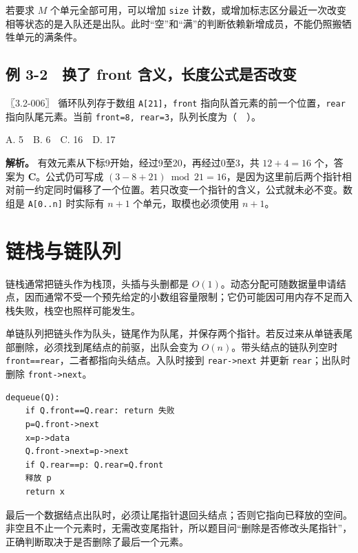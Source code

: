 若要求 \(M\) 个单元全部可用，可以增加 \texttt{size} 计数，或增加标志区分最近一次改变相等状态的是入队还是出队。此时``空''和``满''的判断依赖新增成员，不能仍照搬牺牲单元的满条件。

\subsection{例 3-2　换了 front 含义，长度公式是否改变}\label{ds-ex3-2}

\noindent{}〖3.2-006〗 循环队列存于数组 \texttt{A{[}21{]}}，\texttt{front} 指向队首元素的前一个位置，\texttt{rear} 指向队尾元素。当前 \texttt{front=8,}\allowbreak{}\texttt{\ rear=3}，队列长度为（　）。

A. 5　B. 6　C. 16　D. 17


\textbf{解析。} 有效元素从下标9开始，经过9至20，再经过0至3，共 \(12+4=16\) 个，答案为 \textbf{C}。公式仍可写成 \((3-8+21)\bmod21=16\)，是因为这里前后两个指针相对前一约定同时偏移了一个位置。若只改变一个指针的含义，公式就未必不变。数组是 \texttt{A{[}0..n{]}} 时实际有 \(n+1\) 个单元，取模也必须使用 \(n+1\)。

\section{链栈与链队列}\label{ds-03-04}

链栈通常把链头作为栈顶，头插与头删都是 \(O(1)\)。动态分配可随数据量申请结点，因而通常不受一个预先给定的小数组容量限制；它仍可能因可用内存不足而入栈失败，栈空也照样可能发生。

单链队列把链头作为队头，链尾作为队尾，并保存两个指针。若反过来从单链表尾部删除，必须找到尾结点的前驱，出队会变为 \(O(n)\)。带头结点的链队列空时 \texttt{front==rear}，二者都指向头结点。入队时接到 \texttt{rear-\textgreater{}next} 并更新 \texttt{rear}；出队时删除 \texttt{front-\textgreater{}next}。

\par\medskip\noindent
\begin{minipage}{\linewidth}
\begin{verbatim}
dequeue(Q):
    if Q.front==Q.rear: return 失败
    p=Q.front->next
    x=p->data
    Q.front->next=p->next
    if Q.rear==p: Q.rear=Q.front
    释放 p
    return x
\end{verbatim}
\end{minipage}\par\medskip

最后一个数据结点出队时，必须让尾指针退回头结点；否则它指向已释放的空间。非空且不止一个元素时，无需改变尾指针，所以题目问``删除是否修改头尾指针''，正确判断取决于是否删除了最后一个元素。

